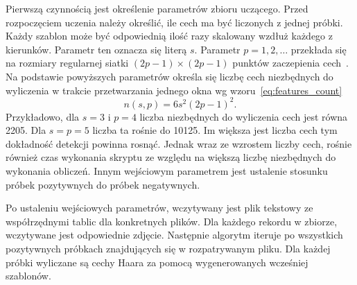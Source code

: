 \FloatBarrier
Pierwszą czynnością jest określenie parametrów zbioru uczącego.
Przed rozpoczęciem uczenia należy określić, ile cech ma być liczonych z jednej próbki.
Każdy szablon może być odpowiednią ilość razy skalowany wzdłuż każdego z kierunków.
Parametr ten oznacza się literą $s$.
Parametr $p=1, 2, \dots$ przekłada się na rozmiary regularnej siatki $(2p - 1) \times (2p-1)$ punktów zaczepienia cech~\cite{szybka_detekcja_klesk}.
Na podstawie powyższych parametrów określa się liczbę cech niezbędnych do wyliczenia w trakcie przetwarzania jednego okna wg wzoru~\eqref{eq:features_count}
\begin{equation}
    \label{eq:features_count}
    n(s,p)=6s^2(2p-1)^2.
\end{equation}
Przykładowo, dla $s=3$ i $p=4$ liczba niezbędnych do wyliczenia cech jest równa 2205.
Dla $s=p=5$ liczba ta rośnie do 10125.
Im większa jest liczba cech tym dokładność detekcji powinna rosnąć.
Jednak wraz ze wzrostem liczby cech, rośnie również czas wykonania skryptu ze względu na większą liczbę niezbędnych do wykonania obliczeń.
Innym wejściowym parametrem jest ustalenie stosunku próbek pozytywnych do próbek negatywnych.

Po ustaleniu wejściowych parametrów, wczytywany jest plik tekstowy ze współrzędnymi tablic dla konkretnych plików.
Dla każdego rekordu w zbiorze, wczytywane jest odpowiednie zdjęcie.
Następnie algorytm iteruje po wszystkich pozytywnych próbkach znajdujących się w rozpatrywanym pliku.
Dla każdej próbki wyliczane są cechy Haara za pomocą wygenerowanych wcześniej szablonów.


